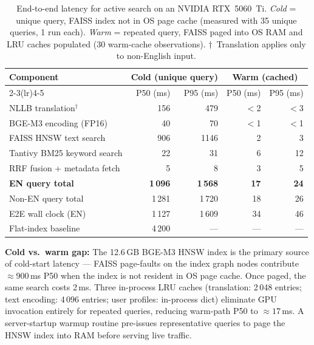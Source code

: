 \begin{table}[H]
\caption{End-to-end latency for active search on an NVIDIA RTX~5060~Ti.
         \emph{Cold} = unique query, FAISS index not in OS page cache
         (measured with 35 unique queries, 1 run each).
         \emph{Warm} = repeated query, FAISS paged into OS RAM and
         LRU caches populated (30 warm-cache observations).
         $\dagger$~Translation applies only to non-English input.}
\label{tab:latency}
\centering
\begin{tabular}{lrrrr}
\toprule
\multirow{2}{*}{\textbf{Component}}
  & \multicolumn{2}{c}{\textbf{Cold (unique query)}}
  & \multicolumn{2}{c}{\textbf{Warm (cached)}} \\
\cmidrule(lr){2-3}\cmidrule(lr){4-5}
  & P50 (ms) & P95 (ms) & P50 (ms) & P95 (ms) \\
\midrule
NLLB translation$^\dagger$  & 156  & 479  & $<$2   & $<$3  \\
BGE-M3 encoding (FP16)      & 40   & 70   & $<$1   & $<$1  \\
FAISS HNSW text search      & 906  & 1146 & 2      & 3     \\
Tantivy BM25 keyword search & 22   & 31   & 6      & 12    \\
RRF fusion + metadata fetch & 5    & 8    & 3      & 5     \\
\midrule
\textbf{EN query total}     & \textbf{1\,096} & \textbf{1\,568} & \textbf{17} & \textbf{24} \\
Non-EN query total          & 1\,281          & 1\,720          & 18          & 26          \\
\midrule
E2E wall clock (EN)         & 1\,127          & 1\,609          & 34          & 46          \\
\midrule
Flat-index baseline         & 4\,200          & ---             & ---         & ---         \\
\bottomrule
\end{tabular}
\smallskip

\noindent\footnotesize
\textbf{Cold vs.\ warm gap:} The 12.6\,GB BGE-M3 HNSW index is the primary
source of cold-start latency — FAISS page-faults on the index graph nodes
contribute ${\approx}900$\,ms P50 when the index is not resident in OS page cache.
Once paged, the same search costs 2\,ms.
Three in-process LRU caches (translation: 2\,048 entries; text encoding:
4\,096 entries; user profiles: in-process dict) eliminate GPU invocation
entirely for repeated queries, reducing warm-path P50 to ${\approx}17$\,ms.
A server-startup warmup routine pre-issues representative queries to page
the HNSW index into RAM before serving live traffic.
\end{table}
